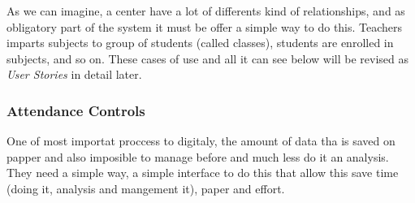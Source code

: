 \noindent{}

As we can imagine, a center have a lot of differents kind of relationships, and as obligatory part of the system it must be offer a simple way to do this. Teachers imparts subjects to group of students (called classes), students are enrolled in subjects, and so on. These cases of use and all it can see below will be revised as \textit{User Stories} in detail later.

\break
\subsubsection{Attendance Controls}
\bigskip

One of most importat proccess to digitaly, the amount of data tha is saved on
papper and also imposible to manage before and much less do it an analysis.
They need a simple way, a simple interface to do this that allow this save time
(doing it, analysis and mangement it), paper and effort.

\noindent{}




